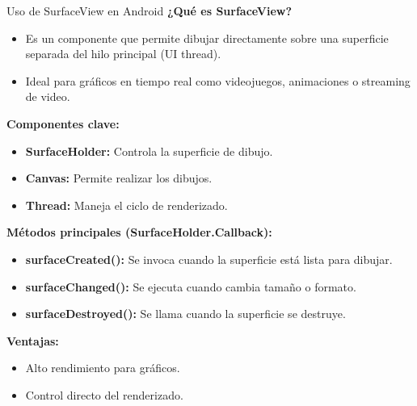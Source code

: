 \begin{frame}[fragile]{Uso de SurfaceView en Android}
\textbf{¿Qué es SurfaceView?}

\begin{itemize}
    \item Es un componente que permite dibujar directamente sobre una superficie separada del hilo principal (UI thread).
    \item Ideal para gráficos en tiempo real como videojuegos, animaciones o streaming de video.
\end{itemize}

\textbf{Componentes clave:}
\begin{itemize}
    \item \textbf{SurfaceHolder:} Controla la superficie de dibujo.
    \item \textbf{Canvas:} Permite realizar los dibujos.
    \item \textbf{Thread:} Maneja el ciclo de renderizado.
\end{itemize}

\textbf{Métodos principales (SurfaceHolder.Callback):}
\begin{itemize}
    \item \textbf{surfaceCreated():} Se invoca cuando la superficie está lista para dibujar.
    \item \textbf{surfaceChanged():} Se ejecuta cuando cambia tamaño o formato.
    \item \textbf{surfaceDestroyed():} Se llama cuando la superficie se destruye.
\end{itemize}

\textbf{Ventajas:}
\begin{itemize}
    \item Alto rendimiento para gráficos.
    \item Control directo del renderizado.
\end{itemize}

\end{frame}





